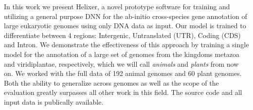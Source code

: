 \documentclass{bioinfo}
\begin{document}
In this work we present Helixer, a novel prototype software for training and utilizing a general purpose DNN for the ab-initio cross-species gene annotation of large eukaryotic genomes using only DNA data as input. Our model is trained to differentiate between 4 regions: Intergenic, Untranslated (UTR), Coding (CDS) and Intron. We demonstrate the effectiveness of this approach by training a single model for the annotation of a large set of genomes from the kingdoms metazoa and viridiplantae, respectively, which we will call {\it animals} and {\it plants} from now on. We worked with the full data of 192 animal genomes and 60 plant genomes. Both the ability to generalize across genomes as well as the scope of the evaluation greatly surpasses all other work in this field. The source code and all input data is publically available.
\end{document}
